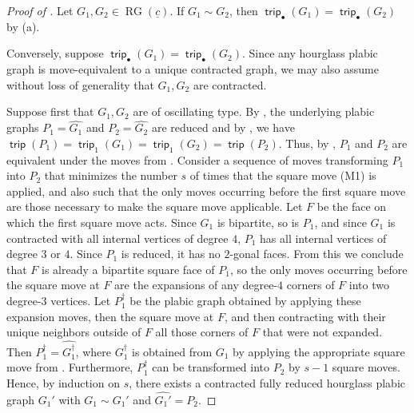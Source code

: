 \documentclass{amsart}
\theoremstyle{definition}
\theoremstyle{remark}
\numberwithin{equation}{section}
\DeclareMathOperator{\trip}{\mathsf{trip}}
\DeclareMathOperator{\rg}{RG}
\begin{document}
\begin{proof}[Proof of ]
Let $G_1,G_2 \in \rg(\underline{c})$. If $G_1 \sim G_2$, then $\trip_{\bullet}(G_1)=\trip_{\bullet}(G_2)$ by (a).

Conversely, suppose $\trip_{\bullet}(G_1)=\trip_{\bullet}(G_2)$. Since any hourglass plabic graph is move-equivalent to a unique contracted graph, we may also assume without loss of generality that $G_1,G_2$ are contracted.


Suppose first that $G_1,G_2$ are of oscillating type. 
By , the underlying plabic graphs $P_1=\widehat{G_1}$ and $P_2=\widehat{G_2}$ are reduced and by , we have  $\trip(P_1)=\trip_1(G_1)=\trip_1(G_2)=\trip(P_2)$. Thus, by , $P_1$ and $P_2$ are equivalent under the moves from . Consider a sequence of moves transforming $P_1$ into $P_2$ that minimizes the number $s$ of times that the square move (M1) is applied, and also such that the only moves occurring before the first square move are those necessary to make the square move applicable. Let $F$ be the face on which the first square move acts. Since $G_1$ is bipartite, so is $P_1$, and since $G_1$ is contracted with all internal vertices of degree $4$, $P_1$ has all internal vertices of degree $3$ or $4$. Since $P_1$ is reduced, it has no $2$-gonal faces. From this we conclude that $F$ is already a bipartite square face of $P_1$, so the only moves occurring before the square move at $F$ are the expansions of any degree-$4$ corners of $F$ into two degree-$3$ vertices. Let $P_1^\dagger$ be the plabic graph obtained by applying these expansion moves, then the square move at $F$, and then contracting with their unique neighbors outside of $F$ all those corners of $F$ that were not expanded. Then $P_1^\dagger=\widehat{G_1^\dagger}$, where $G_1^\dagger$ is obtained from $G_1$ by applying the appropriate square move from . Furthermore, $P_1^\dagger$ can be transformed into $P_2$ by $s-1$ square moves. Hence, by induction on $s$, there exists a contracted fully reduced hourglass plabic graph $G_1'$ with $G_1 \sim G_1'$ and $\widehat{G_1'}=P_2$.


\end{proof}
\end{document}
